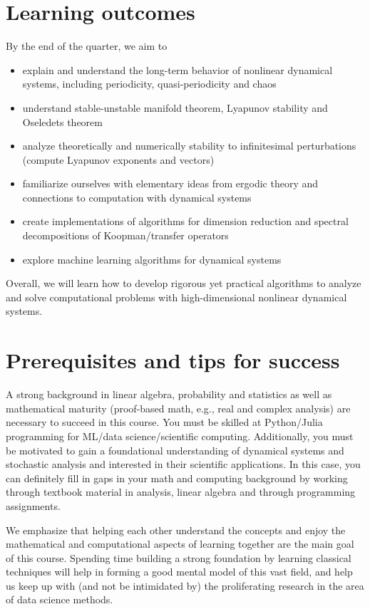 \documentclass[12pt]{article}
\begin{document}
\section{Learning outcomes}
By the end of the quarter, we aim to 
\begin{itemize}
	\item explain and understand the long-term 
	behavior of nonlinear dynamical systems, including periodicity, quasi-periodicity and chaos
	\item understand stable-unstable manifold theorem, Lyapunov stability and Oseledets theorem 
	\item analyze theoretically and numerically stability to infinitesimal perturbations (compute Lyapunov exponents and vectors)
	\item familiarize ourselves with elementary ideas from ergodic theory and connections to computation with dynamical systems
	\item create implementations of algorithms for dimension reduction and spectral decompositions of Koopman/transfer operators
	\item explore machine learning algorithms for dynamical systems 
\end{itemize}
Overall, we will learn how to develop rigorous yet practical algorithms 
to analyze and solve computational problems with high-dimensional nonlinear dynamical systems.


\section{Prerequisites and tips for success}
A strong background in linear algebra, probability and statistics as well as mathematical maturity (proof-based math, e.g., real and complex analysis) are necessary to succeed in this course. You must be skilled at Python/Julia programming for ML/data science/scientific computing. Additionally, you must be motivated to gain a foundational understanding of dynamical systems and stochastic analysis and interested in their scientific applications. In this case, you can definitely fill in gaps in your math and computing background by working through textbook material in analysis, linear algebra and through programming assignments.

We emphasize that helping each other understand the concepts and enjoy the mathematical and computational aspects of learning together are the main goal of this course. Spending time building a strong foundation by learning classical techniques will help in forming a good mental model of this vast field, and help us keep up with (and not be intimidated by) the proliferating research in the area of data science methods.
\end{document}
